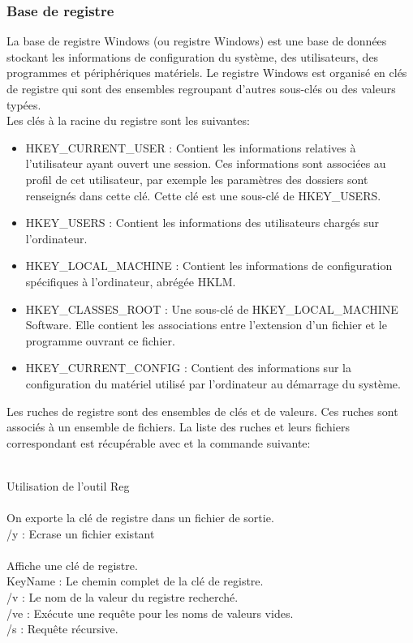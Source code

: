 \documentclass[twoside,a4paper,12pt,titlepage]{book}
\begin{document}
\subsubsection{Base de registre}
La base de registre Windows (ou registre Windows) est une base de données stockant les informations de configuration du système, des utilisateurs, des programmes et périphériques matériels. Le registre Windows est organisé en clés de registre qui sont des ensembles regroupant d'autres sous-clés ou des valeurs typées.\\
Les clés à la racine du registre sont les suivantes:
\begin{itemize}
	\item HKEY\_CURRENT\_USER : Contient les informations relatives à l'utilisateur ayant ouvert une session. Ces informations sont associées au profil de cet utilisateur, par exemple les paramètres des dossiers sont renseignés dans cette clé. Cette clé est une sous-clé de HKEY\_USERS.
	\item HKEY\_USERS : Contient les informations des utilisateurs chargés sur l'ordinateur. 
	\item HKEY\_LOCAL\_MACHINE : Contient les informations de configuration spécifiques à l'ordinateur, abrégée HKLM.
	\item HKEY\_CLASSES\_ROOT : Une sous-clé de HKEY\_LOCAL\_MACHINE Software. Elle contient les associations entre l'extension d'un fichier et le programme ouvrant ce fichier.
	\item HKEY\_CURRENT\_CONFIG : Contient des informations sur la configuration du matériel utilisé par l'ordinateur au démarrage du système.
\end{itemize}
Les ruches de registre sont des ensembles de clés et de valeurs. Ces ruches sont associés à un ensemble de fichiers. La liste des ruches et leurs fichiers correspondant est récupérable avec  et  la commande suivante:\\
\\

\begin{FlagConsole}{Utilisation de l'outil Reg }
\\\\
On exporte la clé de registre dans un fichier de sortie.\\
/y : Ecrase un fichier existant
\tcblower
{}\\\\
Affiche une clé de registre.\\
KeyName : Le chemin complet de la clé de registre.\\
/v : Le nom de la valeur du registre recherché.\\
/ve : Exécute une requête pour les noms de valeurs vides.\\
/s : Requête récursive.\\
\end{FlagConsole}
\end{document}

